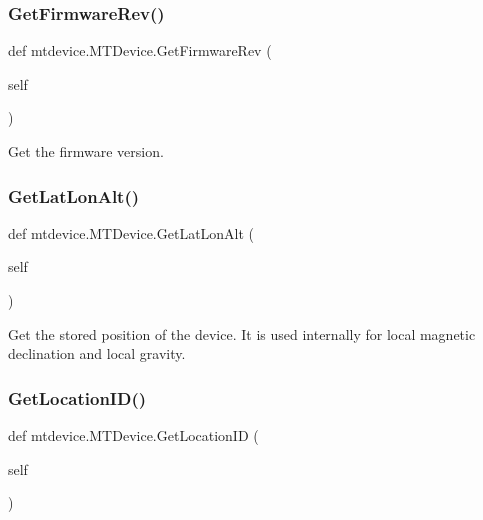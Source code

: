\subsubsection{\texorpdfstring{Get\+Firmware\+Rev()}{GetFirmwareRev()}}
{\footnotesize\ttfamily def mtdevice.\+M\+T\+Device.\+Get\+Firmware\+Rev (\begin{DoxyParamCaption}\item[{}]{self }\end{DoxyParamCaption})}

\begin{DoxyVerb}Get the firmware version.\end{DoxyVerb}
 \mbox{\label{classmtdevice_1_1MTDevice_a80fa3cd0b6bf97a2ba46771e891d3fd1}} 
\subsubsection{\texorpdfstring{Get\+Lat\+Lon\+Alt()}{GetLatLonAlt()}}
{\footnotesize\ttfamily def mtdevice.\+M\+T\+Device.\+Get\+Lat\+Lon\+Alt (\begin{DoxyParamCaption}\item[{}]{self }\end{DoxyParamCaption})}

\begin{DoxyVerb}Get the stored position of the device.
It is used internally for local magnetic declination and local gravity.
\end{DoxyVerb}
 \mbox{\label{classmtdevice_1_1MTDevice_abc9c9bc4f9e83745b2d34df960050efa}} 
\subsubsection{\texorpdfstring{Get\+Location\+I\+D()}{GetLocationID()}}
{\footnotesize\ttfamily def mtdevice.\+M\+T\+Device.\+Get\+Location\+ID (\begin{DoxyParamCaption}\item[{}]{self }\end{DoxyParamCaption})}

